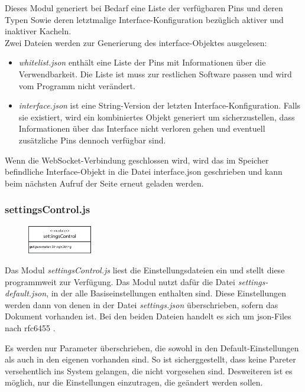 Dieses Modul generiert bei Bedarf eine Liste der verfügbaren Pins und deren Typen Sowie deren letztmalige Interface-Konfiguration bezüglich aktiver und inaktiver Kacheln.\\

\noindent Zwei Dateien werden zur Generierung des interface-Objektes ausgelesen:

\begin{itemize}
  \item \textit{whitelist.json} enthält eine Liste der Pins mit Informationen über die Verwendbarkeit. Die Liste ist muss zur restlichen Software passen und wird vom Programm nicht verändert.
  \item \textit{interface.json} ist eine String-Version der letzten Interface-Konfiguration. Falls sie existiert, wird ein kombiniertes Objekt generiert um sicherzustellen, dass Informationen über das Interface nicht verloren gehen und eventuell zusätzliche Pins dennoch verfügbar sind.
\end{itemize}

Wenn die WebSocket-Verbindung geschlossen wird, wird das im Speicher befindliche Interface-Objekt in die Datei interface.json geschrieben und kann beim nächsten Aufruf der Seite erneut geladen werden.

\subsubsection{settingsControl.js}
\begin{figure}
  \vspace{-16pt}
  \centering
  \includegraphics[width = 0.25\textwidth]{documentation/images/apiSettingsControl.eps}
\end{figure}

Das Modul \textit{settingsControl.js} liest die Einstellungsdateien ein und stellt diese programmweit zur Verfügung. Das Modul nutzt dafür die Datei \textit{settings-default.json}, in der alle Basiseinstellungen enthalten sind. Diese Einstellungen werden dann von denen in der Datei \textit{settings.json} überschrieben, sofern das Dokument vorhanden ist. Bei den beiden Dateien handelt es sich um \gls{json}-Files nach rfc6455 \cite{rfc6455}.

Es werden nur Parameter überschrieben, die sowohl in den Default-Einstellungen als auch in den eigenen vorhanden sind. So ist sicherggestellt, dass keine Pareter versehentlich ins System gelangen, die nicht vorgesehen sind. Desweiteren ist es möglich, nur die Einstellungen einzutragen, die geändert werden sollen.

